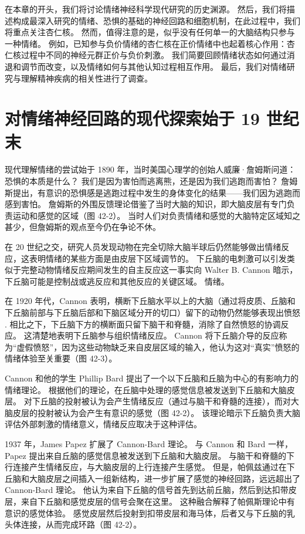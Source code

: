 在本章的开头，我们将讨论情绪神经科学现代研究的历史渊源。 然后，我们将描述构成最深入研究的情绪、恐惧的基础的神经回路和细胞机制，在此过程中，我们将重点关注杏仁核。 然而，值得注意的是，似乎没有任何单一的大脑结构只参与一种情绪。 例如，已知参与负价情绪的杏仁核在正价情绪中也起着核心作用：杏仁核过程中不同的神经元群正价与负价刺激。 我们简要回顾情绪状态如何通过消退和调节而改变，以及情绪如何与其他认知过程相互作用。 最后，我们对情绪研究与理解精神疾病的相关性进行了调查。


\section{对情绪神经回路的现代探索始于 19 世纪末}
现代理解情绪的尝试始于 1890 年，当时美国心理学的创始人威廉·詹姆斯问道：恐惧的本质是什么？ 我们是因为害怕而逃离熊，还是因为我们逃跑而害怕？ 詹姆斯提出，有意识的恐惧感是逃跑过程中发生的身体变化的结果——我们因为逃跑而感到害怕。 詹姆斯的外围反馈理论借鉴了当时大脑的知识，即大脑皮层有专门负责运动和感觉的区域（图 42-2）。 当时人们对负责情绪和感觉的大脑特定区域知之甚少，但詹姆斯的观点至今仍在争论不休。

在 20 世纪之交，研究人员发现动物在完全切除大脑半球后仍然能够做出情绪反应，这表明情绪的某些方面是由皮层下区域调节的。 下丘脑的电刺激可以引发类似于完整动物情绪反应期间发生的自主反应这一事实向 Walter B. Cannon 暗示，下丘脑可能是控制战或逃反应和其他反应的关键区域。 情绪。

在 1920 年代，Cannon 表明，横断下丘脑水平以上的大脑（通过将皮质、丘脑和下丘脑前部与下丘脑后部和下脑区域分开的切口）留下的动物仍然能够表现出愤怒 . 相比之下，下丘脑下方的横断面只留下脑干和脊髓，消除了自然愤怒的协调反应。 这清楚地表明下丘脑参与组织情绪反应。 Cannon 将下丘脑介导的反应称为“虚假愤怒”，因为这些动物缺乏来自皮层区域的输入，他认为这对“真实”愤怒的情绪体验至关重要（图 42-3）。

Cannon 和他的学生 Phillip Bard 提出了一个以下丘脑和丘脑为中心的有影响力的情绪理论。 根据他们的理论，在丘脑中处理的感觉信息被发送到下丘脑和大脑皮层。 对下丘脑的投射被认为会产生情绪反应（通过与脑干和脊髓的连接），而对大脑皮层的投射被认为会产生有意识的感觉（图 42-2）。 该理论暗示下丘脑负责大脑评估外部刺激的情绪意义，情绪反应取决于这种评估。

1937 年，James Papez 扩展了 Cannon-Bard 理论。 与 Cannon 和 Bard 一样，Papez 提出来自丘脑的感觉信息被发送到下丘脑和大脑皮层。 与脑干和脊髓的下行连接产生情绪反应，与大脑皮层的上行连接产生感觉。 但是，帕佩兹通过在下丘脑和大脑皮层之间插入一组新结构，进一步扩展了感觉的神经回路，远远超出了 Cannon-Bard 理论。 他认为来自下丘脑的信号首先到达前丘脑，然后到达扣带皮层，来自下丘脑和感觉皮层的信号会聚在这里。 这种融合解释了帕佩斯理论中有意识的感觉体验。 感觉皮层然后投射到扣带皮层和海马体，后者又与下丘脑的乳头体连接，从而完成环路（图 42-2）。

